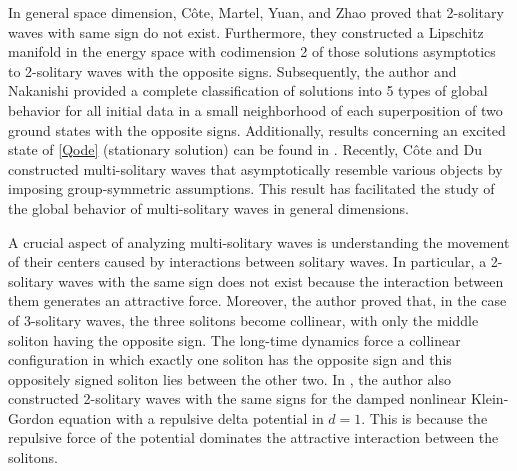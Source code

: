 \documentclass[reqno]{amsart}
\theoremstyle{plain}
\theoremstyle{definition}
\numberwithin{equation}{section}
\newcommand{\1}{\mathbbm{1}}
\begin{document}
 
 In general space dimension, C\^{o}te, Martel, Yuan, and Zhao \cite{CMYZ} proved that 2-solitary waves with same sign do not exist. Furthermore, they constructed a Lipschitz manifold in the energy space with codimension 2 of those solutions asymptotics to 2-solitary waves with the opposite signs. Subsequently, the author and Nakanishi \cite{IN} provided a complete classification of solutions into 5 types of global behavior for all initial data in a small neighborhood of each superposition of two ground states with the opposite signs. Additionally, results concerning an excited state of \eqref{Qode} (stationary solution) can be found in \cite{CY}. Recently, C\^{o}te and Du \cite{CD} constructed multi-solitary waves that asymptotically resemble various objects by imposing group-symmetric assumptions. This result has facilitated the study of the global behavior of multi-solitary waves in general dimensions. 
 
 
A crucial aspect of analyzing multi-solitary waves is understanding the movement of their centers caused by interactions between solitary waves. In particular, a 2-solitary waves with the same sign does not exist because the interaction between them generates an attractive force. Moreover, the author \cite{I2} proved that, in the case of $3$-solitary waves, the three solitons become collinear, with only the middle soliton having the opposite sign. The long-time dynamics force a collinear configuration in which exactly one soliton has the opposite sign and this oppositely signed soliton lies between the other two. In \cite{I}, the author also constructed 2-solitary waves with the same signs for the damped nonlinear Klein-Gordon equation with a repulsive delta potential in $d=1$. This is because the repulsive force of the potential dominates the attractive interaction between the solitons.
\end{document}
